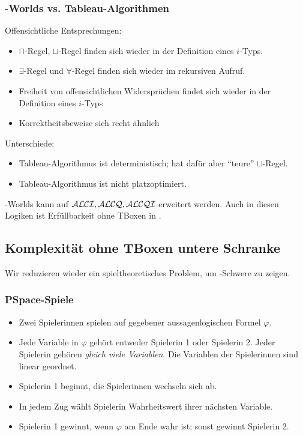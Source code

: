 \subsubsection{\texorpdfstring{\ALC}{ALC}-Worlds vs. Tableau-Algorithmen}
Offensichtliche Entsprechungen:
\begin{itemize}
  \item $\sqcap$-Regel, $\sqcup$-Regel finden sich wieder in der Definition eines $i$-Typs.
  \item $\exists$-Regel und $\forall$-Regel finden sich wieder im rekursiven Aufruf.
  \item Freiheit von offensichtlichen Widersprüchen findet sich wieder in der Definition eines $i$-Typs
  \item Korrektheitsbeweise sich recht ähnlich
\end{itemize}

Unterschiede:

\begin{itemize}
    \item Tableau-Algorithmus ist deterministisch; hat dafür aber \enquote{teure} $\sqcup$-Regel.
    \item Tableau-Algorithmus ist nicht platzoptimiert.
\end{itemize}

\ALC-Worlds kann auf $\mathcal{A}\mathcal{L}\mathcal{C}\mathcal{I}, \mathcal{A}\mathcal{L}\mathcal{C}\mathcal{Q}, \mathcal{A}\mathcal{L}\mathcal{C}\mathcal{Q}\mathcal{I}$ erweitert werden. Auch in diesen Logiken ist Erfüllbarkeit ohne TBoxen in \PSpace.

\subsection{Komplexität ohne TBoxen untere
Schranke}\label{komplexituxe4t-ohne-tboxen-untere-schranke}

Wir reduzieren wieder ein spieltheoretisches Problem, um \PSpace-Schwere zu zeigen.


\subsubsection{PSpace-Spiele}

\begin{itemize}
    \item Zwei Spielerinnen spielen auf gegebener aussagenlogischen Formel $\varphi$.
    \item Jede Variable in $\varphi$ gehört entweder Spielerin 1 oder Spielerin 2. Jeder Spielerin gehören \emph{gleich viele Variablen}. Die Variablen der Spielerinnen sind linear geordnet.
    \item Spielerin 1 beginnt, die Spielerinnen wechseln sich ab.

    \item In jedem Zug wählt Spielerin Wahrheitswert ihrer nächsten Variable.

    \item Spielerin 1 gewinnt, wenn $\varphi$ am Ende wahr ist; sonst gewinnt Spielerin 2.
\end{itemize}

